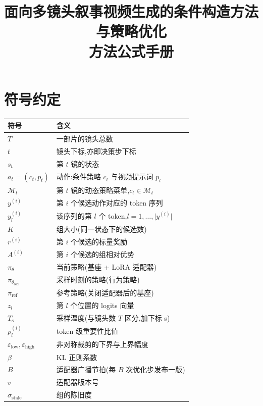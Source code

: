 \documentclass[UTF8, 11pt]{ctexart}
\title{面向多镜头叙事视频生成的条件构造方法与策略优化\\[4pt]
       \large 方法公式手册}
\author{}
\date{}
\begin{document}
\maketitle
\vspace{-2em}
\tableofcontents
\newpage

\section{符号约定}

\begin{tabular}{ll}
\hline
符号 & 含义 \\
\hline
$T$ & 一部片的镜头总数 \\
$t$ & 镜头下标,亦即决策步下标 \\
$s_t$ & 第 $t$ 镜的状态 \\
$a_t=(c_t,p_t)$ & 动作:条件策略 $c_t$ 与视频提示词 $p_t$ \\
$\mathcal{M}_t$ & 第 $t$ 镜的动态策略菜单,$c_t\in\mathcal{M}_t$ \\
$y^{(i)}$ & 第 $i$ 个候选动作对应的 token 序列 \\
$y^{(i)}_l$ & 该序列的第 $l$ 个 token,$l=1,\dots,\lvert y^{(i)}\rvert$ \\
$K$ & 组大小(同一状态下的候选数) \\
$r^{(i)}$ & 第 $i$ 个候选的标量奖励 \\
$A^{(i)}$ & 第 $i$ 个候选的组相对优势 \\
$\pi_\theta$ & 当前策略(基座 + LoRA 适配器) \\
$\pi_{\theta_{\text{old}}}$ & 采样时刻的策略(行为策略) \\
$\pi_{\text{ref}}$ & 参考策略(关闭适配器后的基座) \\
$z_l$ & 第 $l$ 个位置的 logits 向量 \\
$T_{\text{s}}$ & 采样温度(与镜头数 $T$ 区分,加下标 s) \\
$\rho^{(i)}_l$ & token 级重要性比值 \\
$\varepsilon_{\text{low}},\varepsilon_{\text{high}}$ & 非对称裁剪的下界与上界幅度 \\
$\beta$ & KL 正则系数 \\
$B$ & 适配器广播节拍(每 $B$ 次优化步发布一版) \\
$v$ & 适配器版本号 \\
$\sigma_{\text{stale}}$ & 组的陈旧度 \\
\hline
\end{tabular}
\end{document}
